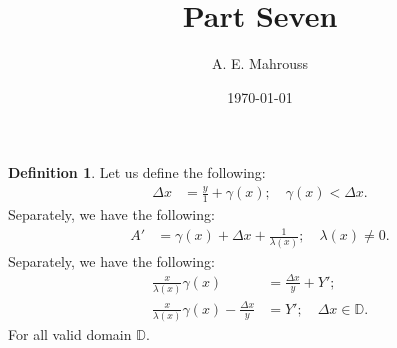 \documentclass[10pt]{article}
\title{%
  \vspace{-1.5em}%
  \large\textbf{Part Seven}%
}
\author{A. E. Mahrouss}
\date{\today}
\theoremstyle{plain}
\theoremstyle{definition}
\newtheorem{definition}[theorem]{Definition}
\theoremstyle{remark}
\begin{document}
\begin{definition}
	Let us define the following:
	\begin{align*}
	\Delta x &=	\frac{y}{1} + \gamma(x); \quad \gamma(x) < \Delta x.
	\end{align*}
  Separately, we have the following:
	\begin{align*}
		A' &= \gamma(x)+\Delta x + \frac{1}{\lambda(x)}; \quad \lambda(x) \neq 0.
	\end{align*}
  Separately, we have the following:
	\begin{align*}
		\frac{x}{\lambda(x)} \gamma(x) &= \frac{\Delta x}{y} + Y';\\
		\frac{x}{\lambda(x)} \gamma(x) - \frac{\Delta x}{y} &= Y'; \quad \Delta x \in \mathbb{D}.
	\end{align*}
	For all valid domain $\mathbb{D}$.
\end{definition}

\nocite{*}


\end{document}
